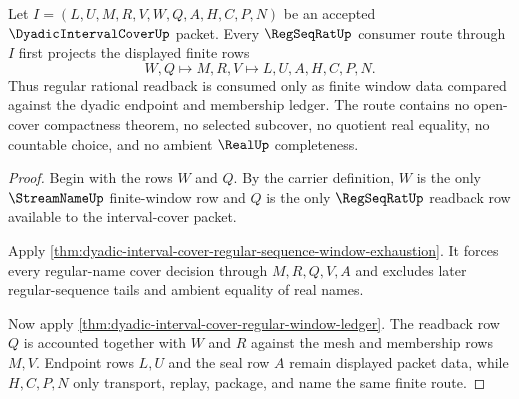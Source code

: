 \begin{theorem}
\label{thm:dyadic-interval-cover-regseqrat-route}
Let $I=(L,U,M,R,V,W,Q,A,H,C,P,N)$ be an accepted $\DyadicIntervalCoverUp$ packet. Every $\RegSeqRatUp$ consumer route through $I$ first projects the displayed finite rows
$$
W,Q \longmapsto M,R,V \longmapsto L,U,A,H,C,P,N .
$$
Thus regular rational readback is consumed only as finite window data compared against the dyadic endpoint and membership ledger. The route contains no open-cover compactness theorem, no selected subcover, no quotient real equality, no countable choice, and no ambient $\RealUp$ completeness.
\end{theorem}
\begin{proof}
Begin with the rows $W$ and $Q$. By the carrier definition, $W$ is the only $\StreamNameUp$ finite-window row and $Q$ is the only $\RegSeqRatUp$ readback row available to the interval-cover packet.

Apply \autoref{thm:dyadic-interval-cover-regular-sequence-window-exhaustion}. It forces every regular-name cover decision through $M,R,Q,V,A$ and excludes later regular-sequence tails and ambient equality of real names.

Now apply \autoref{thm:dyadic-interval-cover-regular-window-ledger}. The readback row $Q$ is accounted together with $W$ and $R$ against the mesh and membership rows $M,V$. Endpoint rows $L,U$ and the seal row $A$ remain displayed packet data, while $H,C,P,N$ only transport, replay, package, and name the same finite route.
\end{proof}


